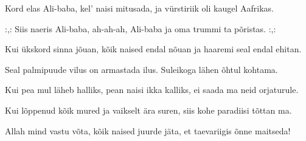 Kord elas Ali-baba, 
kel' naisi mitusada,
ja v\"urstiriik oli kaugel Aafrikas.

:,: Siis naeris Ali-baba, 
ah-ah-ah, Ali-baba
ja oma trummi ta p\~oristas. :,: 

Kui \"ukskord sinna j\~ouan, 
k\~oik naised endal n\~ouan
ja haaremi seal endal ehitan.

Seal palmipuude vilus 
on armastada ilus.
Suleikoga l\"ahen \~ohtul kohtama.

Kui pea mul l\"aheb halliks,
pean naisi ikka kalliks,
ei saada ma neid orjaturule.

Kui l\~oppenud k\~oik mured
ja vaikselt \"ara suren,
siis kohe paradiisi t\~ottan ma.

Allah mind vastu v\~ota, 
k\~oik naised juurde j\"ata,
et taevariigis \~onne maitseda!